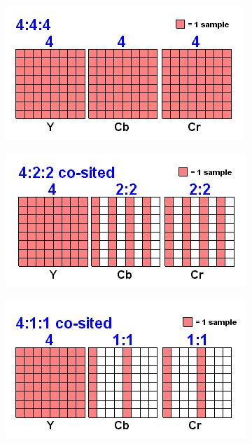 \documentclass[a4paper,11pt]{article} %
\begin{document}
\begin{minipage}{0.3\textwidth}
\centering
    \includegraphics[width=\linewidth]{Sampling 444.png}
\end{minipage}%
\hspace{0.05\textwidth}%
\begin{minipage}{0.3\textwidth}
\centering
    \includegraphics[width=\linewidth]{Sampling 422.png}
\end{minipage}%
\hspace{0.05\textwidth}%
\begin{minipage}{0.3\textwidth}
\centering
    \includegraphics[width=\linewidth]{Sampling 411.png}
\end{minipage}
\end{document}
